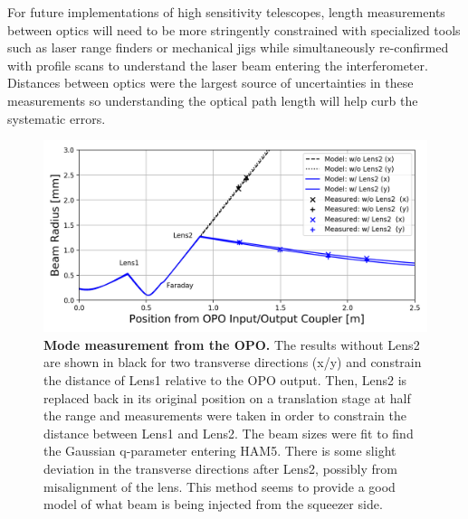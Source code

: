 	For future implementations of high sensitivity telescopes, length measurements between optics will need to be more stringently constrained with specialized tools such as laser range finders or mechanical jigs while simultaneously re-confirmed with profile scans to understand the laser beam entering the interferometer.  Distances between optics were the largest source of uncertainties in these measurements so understanding the optical path length will help curb the systematic errors.
	
	\begin{figure}[]
		\centering
		\includegraphics[width=0.8 \textwidth]{../Figures/OPO_to_ZM2_fit.png}
		\caption[Mode measurement from the OPO.]  
		{\textbf{Mode measurement from the OPO.}
			The results without Lens2 are shown in black for two transverse directions (x/y) and constrain the distance of Lens1 relative to the OPO output.  Then, Lens2 is replaced back in its original position on a translation stage at half the range and measurements were taken in order to constrain the distance between Lens1 and Lens2.  The beam sizes were fit to find the Gaussian q-parameter entering HAM5. There is some slight deviation in the transverse directions after Lens2, possibly from misalignment of the lens.  This method seems to provide a good model of what beam is being injected from the squeezer side.
		}
		\label{fig:OPO_to_ZM2}
	\end{figure}
